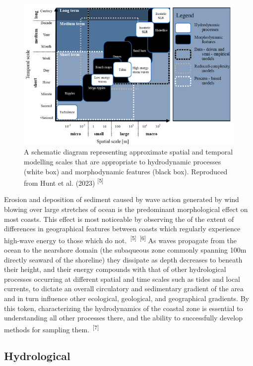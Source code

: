 \documentclass{article}
\begin{document}
\begin{figure}
    \centering
    \includegraphics[width=0.8\linewidth]{images/spatial-and-temporal.png}
    \caption{A schematic diagram representing approximate spatial and temporal modelling scales that are appropriate to hydrodynamic processes (white box) and morphodynamic features (black box). Reproduced from Hunt et al. (2023) \textsuperscript{[5]}}
    \label{figure1}
\end{figure}

{Erosion and deposition of sediment caused by wave action generated by wind blowing over large stretches of ocean is the predominant morphological effect on most coasts. This effect is most noticeable by observing the of the extent of differences in geographical features between coasts which regularly experience high-wave energy to those which do not.~\textsuperscript{[5]}~\textsuperscript{[6]} As waves propagate from the ocean to the nearshore domain (the subaqueous zone commonly spanning 100m directly seaward of the shoreline) they dissipate as depth decreases to beneath their height, and their energy compounds with that of other hydrological processes occurring at different spatial and time scales such as tides and local currents, to dictate an overall circulatory and sedimentary gradient of the area and in turn influence other ecological, geological, and geographical gradients. By this token, characterizing the hydrodynamics of the coastal zone is essential to understanding all other processes there, and the ability to successfully develop methods for sampling them.~\textsuperscript{[7]} \par}

\newpage
{}
\fancyfoot[C]{\thepage} 
\thispagestyle{fancy}
\subsection{Hydrological}
\end{document}
